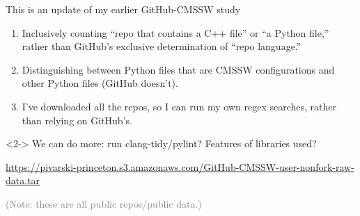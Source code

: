 \documentclass[aspectratio=169]{beamer}
\begin{document}
\begin{frame}{This is an update of my earlier GitHub-CMSSW study}
\vspace{0.5 cm}
\large

\begin{enumerate}\setlength{\itemsep}{0.35 cm}
\item Inclusively counting ``repo that contains a C++ file'' or ``a Python file,'' rather than GitHub's exclusive determination of ``repo language.''

\item Distinguishing between Python files that are CMSSW configurations and other Python files (GitHub doesn't).

\item I've downloaded all the repos, so I can run my own regex searches, rather than relying on GitHub's.
\end{enumerate}

\vspace{0.5 cm}
\begin{uncoverenv}<2->
We can do more: run clang-tidy/pylint? Features of libraries used?

\textcolor{blue}{\scriptsize\url{https://pivarski-princeton.s3.amazonaws.com/GitHub-CMSSW-user-nonfork-raw-data.tar}}

\vspace{0.5 cm}
\textcolor{gray}{\normalsize (Note: these are all public repos/public data.)}
\end{uncoverenv}
\end{frame}
\end{document}
